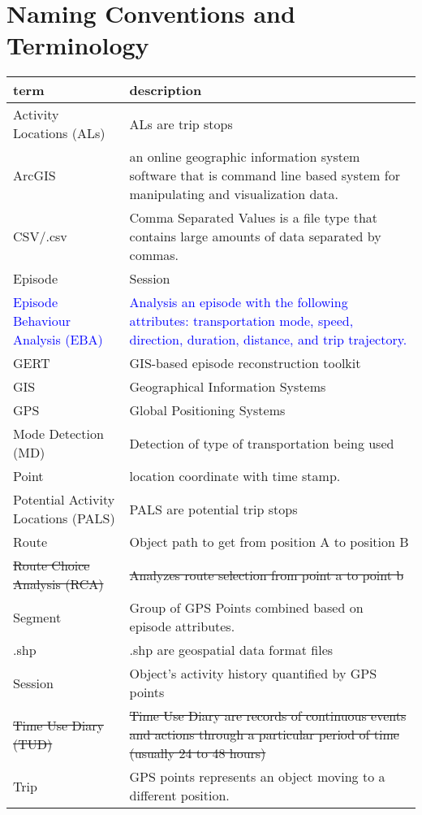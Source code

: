 \documentclass[12pt, titlepage]{article}
\begin{document}
\section{Naming Conventions and Terminology}
\begin{tabular}{l p{6cm}} 
  \toprule		
  \textbf{term} & \textbf{description}\\
  \midrule 
  Activity Locations (ALs) & ALs are trip stops \\
  ArcGIS & an online geographic information system software that is command line based system for manipulating and visualization data.\\
  CSV/.csv & Comma Separated Values is a file type that contains large amounts of data separated by commas. \\
  Episode & Session\\
  \textcolor{blue}{Episode Behaviour Analysis (EBA)} & \textcolor{blue}{Analysis an episode with the following attributes: transportation mode, speed, direction, duration, distance, and trip trajectory.} \\
  GERT & GIS-based episode reconstruction toolkit \\
  GIS & Geographical Information Systems\\
  GPS & Global Positioning Systems\\
  Mode Detection (MD) & Detection of type of transportation being used \\
  Point & location coordinate with time stamp.\\
  Potential Activity Locations (PALS) & PALS are potential trip stops \\
  Route & Object path to get from position A to position B\\
  \sout{Route Choice Analysis (RCA)} & \sout{Analyzes route selection from point a to point b}\\
  Segment & Group of GPS Points combined based on episode attributes.\\
  .shp & .shp are geospatial data format files\\
  Session & Object's activity history quantified by GPS points \\
  \sout{Time Use Diary (TUD)} & \sout{Time Use Diary are records of continuous events and actions through a particular period of time (usually 24 to 48 hours)}\\
  Trip & GPS points represents an object moving to a different position.\\
  
  \bottomrule
\end{tabular}\\
\end{document}
